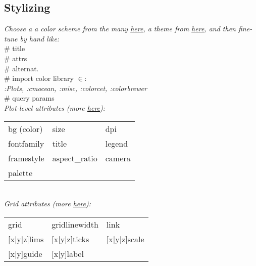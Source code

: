 \subsection*{Stylizing}
\textit{Choose a a color scheme from the many \href{https://docs.juliaplots.org/latest/generated/plotthemes/}{here}, a theme from \href{https://docs.juliaplots.org/latest/generated/plotthemes/}{here}, and then fine-tune by hand like:} \\
 \# title \\
 \# attrs \\
 \# alternat. \\
 \# import color library $\in$: \\ 
\textit{:Plots, :cmocean, :misc, :colorcet, :colorbrewer} \\
 \# query params \\

\textit{Plot-level attributes (more \href{https://docs.juliaplots.org/latest/generated/attributes\_plot/}{here}):}\\
{\scriptsize
\begin{tabular}{l l l}
    bg (color)      & size          & dpi \\
    fontfamily      & title         & legend \\
    framestyle      & aspect\_ratio & camera \\
    palette         \\
\end{tabular}
}\\
\textit{Grid attributes (more \href{https://docs.juliaplots.org/latest/generated/attributes\_plot/}{here}):}\\
{\scriptsize
\begin{tabular}{l l l}
    grid            & gridlinewidth         & link \\
    {[x|y|z]}lims     & [x|y|z]ticks          & [x|y|z]scale\\
    {[x|y]}guide      & [x|y]label \\
\end{tabular}
}

